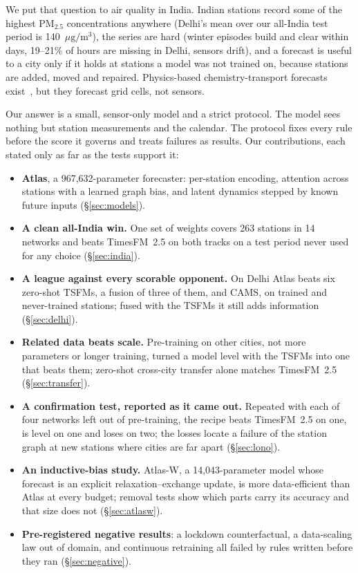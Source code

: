 \documentclass{article}
\newcommand{\pmu}{\ensuremath{\mu\mathrm{g/m^3}}}
\newcommand{\pmtf}{PM$_{2.5}$}
\begin{document}
We put that question to air quality in India. Indian stations record some of the highest \pmtf{} concentrations
anywhere (Delhi's mean over our all-India test period is 140~\pmu), the series are hard (winter episodes build and
clear within days, 19--21\% of hours are missing in Delhi, sensors drift), and a forecast is useful to a city only if it
holds at stations a model was not trained on, because stations are added, moved and repaired. Physics-based
chemistry-transport forecasts exist~\citep{inness2019cams,yadav2025aqews}, but they forecast grid cells, not sensors.

Our answer is a small, sensor-only model and a strict protocol. The model sees nothing but station measurements and
the calendar. The protocol fixes every rule before the score it governs and treats failures as results. Our
contributions, each stated only as far as the tests support it:
\begin{itemize}
\item \textbf{Atlas}, a 967,632-parameter forecaster: per-station encoding, attention across stations with a learned
  graph bias, and latent dynamics stepped by known future inputs (\S\ref{sec:models}).
\item \textbf{A clean all-India win.} One set of weights covers 263 stations in 14 networks and beats TimesFM~2.5 on
  both tracks on a test period never used for any choice (\S\ref{sec:india}).
\item \textbf{A league against every scorable opponent.} On Delhi Atlas beats six zero-shot TSFMs, a fusion of three
  of them, and CAMS, on trained and never-trained stations; fused with the TSFMs it still adds information
  (\S\ref{sec:delhi}).
\item \textbf{Related data beats scale.} Pre-training on other cities, not more parameters or longer training, turned a
  model level with the TSFMs into one that beats them; zero-shot cross-city transfer alone matches TimesFM~2.5
  (\S\ref{sec:transfer}).
\item \textbf{A confirmation test, reported as it came out.} Repeated with each of four networks left out of
  pre-training, the recipe beats TimesFM~2.5 on one, is level on one and loses on two; the losses locate a failure of
  the station graph at new stations where cities are far apart (\S\ref{sec:lono}).
\item \textbf{An inductive-bias study.} Atlas-W, a 14,043-parameter model whose forecast is an explicit
  relaxation--exchange update, is more data-efficient than Atlas at every budget; removal tests show which parts
  carry its accuracy and that size does not (\S\ref{sec:atlasw}).
\item \textbf{Pre-registered negative results}: a lockdown counterfactual, a data-scaling law out of domain, and
  continuous retraining all failed by rules written before they ran (\S\ref{sec:negative}).
\end{itemize}
\end{document}
